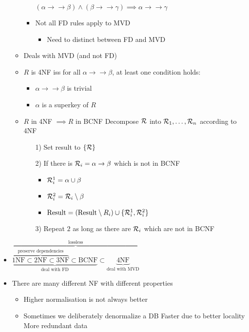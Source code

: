 \begin{itemize}
\begin{itemize}
\begin{itemize}
                     $(\alpha \to \to \beta) \wedge (\beta \to \to \gamma) \implies \alpha \to \to \gamma$
                    \item Not all FD rules apply to MVD
                        \begin{itemize}
                            \item Need to distinct between FD and MVD
                        \end{itemize}
                \end{itemize}
            \item Deals with MVD (and not FD)
            \item $R$ is 4NF iss for all $\alpha \to \to \beta$, at least one condition holds:
                \begin{itemize}
                    \item $\alpha \to \to \beta$ is trivial
                    \item $\alpha$ is a superkey of $R$
                \end{itemize}
            \item $R$ in 4NF $\implies R$ in BCNF
             Decompose $\mathcal{R}$ into $\mathcal{R}_1, \dots, \mathcal{R}_n$ according to 4NF
                \begin{itemize}
                    \item[1)] Set result to $\{\mathcal{R}\}$
                    \item[2)] If there is $\mathcal{R}_i = \alpha \to \beta$ which is not in BCNF
                        \begin{itemize}
                            \item $\mathcal{R}^1_i = \alpha \cup \beta$
                            \item $\mathcal{R}^2_i = \mathcal{R}_i \setminus \beta$
                            \item $\text{Result} = (\text{Result} \setminus R_i) \cup \{\mathcal{R}^1_i, \mathcal{R}^2_i\}$
                        \end{itemize}
                    \item[3)] Repeat $2$ as long as there are $\mathcal{R}_i$ which are not in BCNF
                \end{itemize}  
        \end{itemize}
    \item $\overbrace{\underbrace{\overbrace{\text{1NF} \subset \text{2NF} \subset \text{3NF}}^{\text{preserve dependencies}} \subset \text{BCNF}}_{\text{deal with FD}} \subset \underbrace{\text{4NF}}_{\text{deal with MVD}}}^{\text{lossless}}$
    \item There are many different NF with different properties
        \begin{itemize}
            \item Higher normalisation is not always better
            \item Sometimes we deliberately denormalize a DB
            \ipro Faster due to better locality
            \icon More redundant data
        \end{itemize}
\end{itemize}
